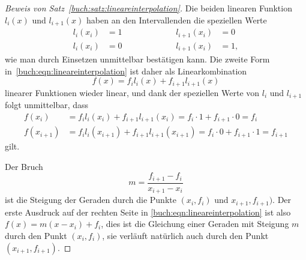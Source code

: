 \begin{proof}[Beweis von Satz~\ref{buch:satz:lineareinterpolation}]
Die beiden linearen Funktion $l_i(x)$ und $l_{i+1}(x)$ haben an den 
Intervallenden die speziellen Werte
\[
\begin{aligned}
l_i(x_i)&=1  &\qquad&\qquad& l_{i+1}(x_i)&=0 \\
l_i(x_i)&=0  &\qquad&\qquad& l_{i+1}(x_i)&=1,
\end{aligned}
\]
wie man durch Einsetzen unmittelbar bestätigen kann.
Die zweite Form in~\eqref{buch:eqn:lineareinterpolation}
ist daher als Linearkombination
\[
f(x)=f_il_i(x) + f_{i+1}l_{i+1}(x)
\]
linearer Funktionen wieder
linear, und dank der speziellen Werte von $l_i$ und $l_{i+1}$ folgt
unmittelbar, dass
\begin{align*}
f(x_i)&=f_il_i(x_i) + f_{i+1}l_{i+1}(x_i) = f_i\cdot 1 + f_{i+1}\cdot 0= f_i\\
f(x_{i+1})&=f_il_i(x_{i+1}) + f_{i+1}l_{i+1}(x_{i+1})= f_i\cdot 0 + f_{i+1}\cdot 1=f_{i+1}
\end{align*}
gilt.

Der Bruch
\[
m = \frac{f_{i+1}-f_i}{x_{i+1}-x_i}
\]
ist die Steigung der Geraden durch die Punkte $(x_i,f_i)$ und
$x_{i+1},f_{i+1})$.
Der erste Ausdruck auf der rechten Seite in
\eqref{buch:eqn:lineareinterpolation} ist
also $f(x)=m(x-x_i)+f_i$, dies ist die Gleichung einer Geraden
mit Steigung $m$ durch den Punkt $(x_i,f_i)$, sie verläuft natürlich
auch durch den Punkt $(x_{i+1},f_{i+1})$.
\end{proof}


